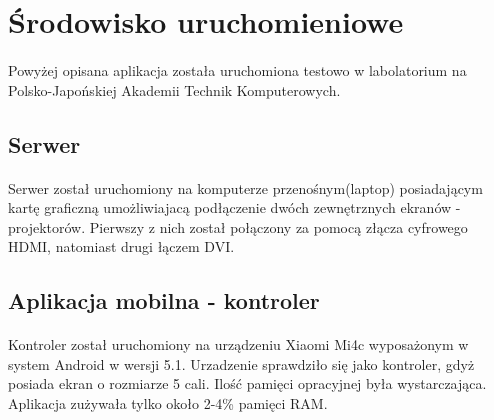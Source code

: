 \section{Środowisko uruchomieniowe}
\paragraph{}
Powyżej opisana aplikacja została uruchomiona testowo w labolatorium na Polsko-Japońskiej Akademii Technik Komputerowych.

\subsection{Serwer}
\paragraph{}
Serwer został uruchomiony na komputerze przenośnym(laptop) posiadającym kartę graficzną umożliwiajacą podłączenie dwóch zewnętrznych ekranów - projektorów. Pierwszy z nich został połączony za pomocą złącza cyfrowego HDMI, natomiast drugi łączem DVI.
\subsection{Aplikacja mobilna - kontroler}
\paragraph{}
Kontroler został uruchomiony na urządzeniu Xiaomi Mi4c wyposażonym w system Android w wersji 5.1. Urzadzenie sprawdziło się jako kontroler, gdyż posiada ekran o rozmiarze 5 cali. Ilość pamięci opracyjnej była wystarczająca. Aplikacja zużywała tylko około 2-4\% pamięci RAM. 